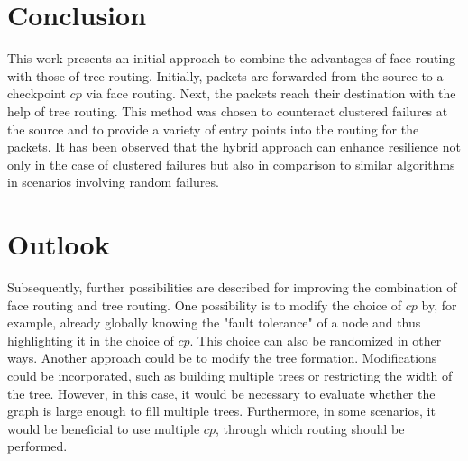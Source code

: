 \documentclass[conference]{IEEEtran}
\begin{document}
\section{Conclusion}\label{conclusion}
This work presents an initial approach to combine the advantages of face routing with those of tree routing. Initially, packets are forwarded from the source to a checkpoint $cp$ via face routing. 
Next, the packets reach their destination with the help of tree routing. 
This method was chosen to counteract clustered failures at the source and to provide a variety of entry points into the routing for the packets.
It has been observed that the hybrid approach can enhance resilience not only in the case of clustered failures but also in comparison to similar algorithms in scenarios involving random failures.

\section{Outlook}
\label{outlook}
Subsequently, further possibilities are described for improving the combination of face routing and tree routing.
One possibility is to modify the choice of $cp$ by, for example, already globally knowing the "fault tolerance" of a node and thus highlighting it in the choice of $cp$. This choice can also be randomized in other ways.
Another approach could be to modify the tree formation. Modifications could be incorporated, such as building multiple trees or restricting the width of the tree. However, in this case, it would be necessary to evaluate whether the graph is large enough to fill multiple trees.
Furthermore, in some scenarios, it would be beneficial to use multiple $cp$, through which routing should be performed.




\balance


\end{document}
